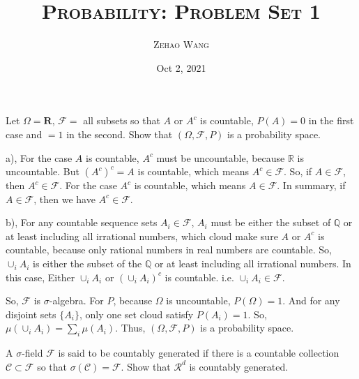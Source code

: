 \documentclass[en, normal, 11pt, black]{elegantnote}
\title{\textsc{Probability: Problem Set 1}}
\author{\textsc{Zehao Wang}}
\date{Oct 2, 2021}
\newenvironment{exercise}[1]{\begin{tcolorbox}[colback=black!15, colframe=black!80, breakable, title=#1]}{\end{tcolorbox}}
\renewenvironment{proof}{\begin{tcolorbox}[colback=white, colframe=black!50, breakable, title=Proof. ]\setlength{\parskip}{0.8em}}{\\\rightline{$\square$}\end{tcolorbox}}
\begin{document}
\maketitle
    \begin{exercise}{1.1.1}
        Let $\Omega=\mathbf{R}$, $\mathcal{F}=$ all subsets so that $A$ or $A^c$ is countable, $P(A) = 0$ in the first case and $= 1$ in the second. Show that $(\Omega,\mathcal{F},P)$ is a probability space. 
    \end{exercise}
    \begin{proof}
        a), For the case $A$ is countable, $A^c$ must be uncountable, because $\mathbb{R}$ is uncountable. But $(A^c)^c=A$ is countable, which means $A^c\in\mathcal{F}$. So, if $A\in\mathcal{F}$, then $A^c\in\mathcal{F}$. For the case $A^c$ is countable, which means $A\in\mathcal{F}$. In summary, if $A\in\mathcal{F}$, then we have $A^c\in\mathcal{F}$. 

        b), For any countable sequence sets $A_i\in\mathcal{F}$, $A_i$ must be either the subset of $\mathbb{Q}$ or at least including all irrational numbers, which cloud make sure $A$ or $A^c$ is countable, because only rational numbers in real numbers are countable. So, $\cup_iA_i$ is either the subset of the $\mathbb{Q}$ or at least including all irrational numbers. In this case, Either $\cup_iA_i$ or $(\cup_iA_i)^c$ is countable. i.e. $\cup_iA_i\in\mathcal{F}$. 

        So, $\mathcal{F}$ is $\sigma$-algebra. For $P$, because $\Omega$ is uncountable, $P(\Omega)=1$. And for any disjoint sets $\{A_i\}$, only one set cloud satisfy $P(A_i)=1$. So, $\mu(\cup_iA_i)=\sum_i\mu(A_i)$. Thus, $(\Omega,\mathcal{F},P)$ is a probability space. 
    \end{proof}
    
    \begin{exercise}{1.1.3}
        A $\sigma$-field $\mathcal{F}$ is said to be countably generated if there is a countable collection $\mathcal{C} \subset \mathcal{F}$ so that $\sigma(\mathcal{C}) = \mathcal{F}$. Show that $\mathcal{R}^d$ is countably generated. 
    \end{exercise}
\end{document}
